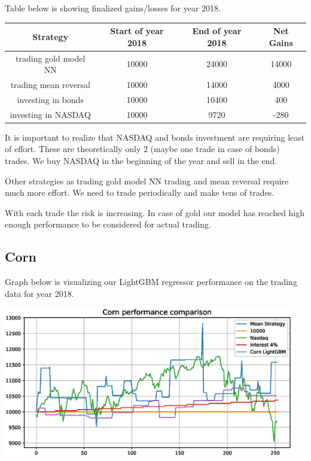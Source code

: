 \documentclass[final,2p]{elsarticle}
\begin{document}
Table below is showing finalized gains/losses for year 2018.

\begin{center}
    \begin{tabular}{cccc}
        Strategy & Start of year 2018 & End of year 2018 & Net Gains \\
        \hline
        trading gold model NN & 10000 & 24000 & 14000 \\
        trading mean reversal & 10000 & 14000 & 4000 \\
        investing in bonds & 10000 & 10400 & 400 \\
        investing in NASDAQ & 10000 & 9720 & -280 \\
    \end{tabular}
\end{center}

It is important to realize that NASDAQ and bonds investment are requiring least of effort.
These are theoretically only $2$ (maybe one trade in case of bonds) trades. We buy NASDAQ in the
beginning of the year and sell in the end.

Other strategies as trading gold model NN trading and mean reversal require much more effort. We
need to trade periodically and make tens of trades.

With each trade the risk is increasing. In case of gold our model has reached high enough performance
to be considered for actual trading.

\subsection{Corn}

Graph below is visualizing our LightGBM regressor performance on the trading data for year 2018.

\begin{center}
\includegraphics[width = 5in]{figures/corn_benchmark_performance.eps}
\end{center}
\end{document}
